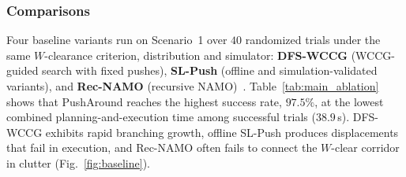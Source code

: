 \subsubsection{Comparisons}\label{subsec:comparisons}
Four baseline variants run on Scenario~1 over $40$ randomized trials under the same $W$-clearance criterion, distribution and simulator:
\textbf{DFS-WCCG} (WCCG-guided search with fixed pushes), \textbf{SL-Push}
(offline and simulation-validated variants), and \textbf{Rec-NAMO} (recursive
NAMO)~\cite{stilman2007manipulation,yao2024local,saxena2023planning,ren2025search}.
Table~\ref{tab:main_ablation} shows that PushAround reaches the highest success
rate, $97.5\%$, at the lowest combined planning-and-execution time among
successful trials ($38.9$\,s).
DFS-WCCG exhibits rapid branching growth, offline SL-Push produces displacements that fail in execution, and Rec-NAMO often fails to connect the $W$-clear corridor in clutter (Fig.~\ref{fig:baseline}).


